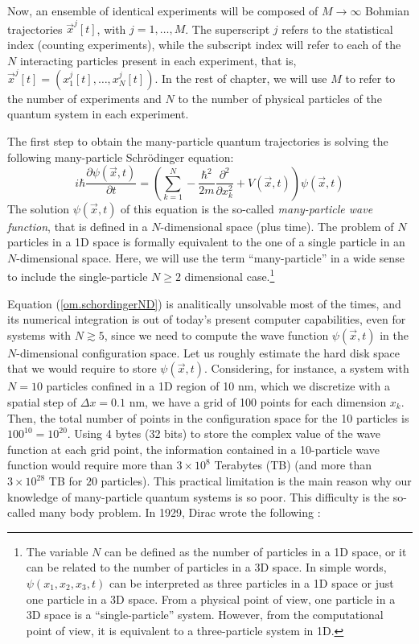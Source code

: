 \documentclass[nofootinbib, secnumarabic, amsmath, nobibnotes,11pt,aps,pra, floatfix]{revtex4-1}
\newcommand{\Eref}[1]{Equation (\ref{#1})}
\begin{document}
Now, an ensemble of identical experiments  will be composed of $M\rightarrow\infty$
Bohmian trajectories $\vec{x}^j[t]$, with $j = 1,\ldots,M$. The superscript
$j$ refers to the statistical index (counting experiments), while
the subscript index will refer to each of the $N$ interacting particles present in each experiment,
that is, $\vec{x}^j[t] = (x^j_{1}[t],\ldots,x^j_{N}[t] )$. In the rest of chapter, we will use $M$ to refer to the number of experiments and $N$ to the number of physical particles of the quantum system in each experiment. 

The first step to obtain the many-particle quantum trajectories is solving the following many-particle Schr\"{o}dinger equation:
\begin{equation}
\label{om.schordingerND}
i \hbar \frac{\partial \psi(\vec{x},t)}{\partial t} = \left(\sum_{k = 1}^N -\frac{\hbar^2}{2m}\frac {\partial^2} {\partial x_k^2} + V(\vec{x},t) \right) \psi(\vec{x},t)
\end{equation}
The solution $\psi(\vec{x},t)$ of this equation is the so-called
\textit{many-particle wave function}, that is defined in a
$N$-dimensional space (plus time). The problem of $N$ particles in a
1D space is formally equivalent to the one of a single particle in
an $N$-dimensional space. Here, we will use the term ``many-particle''
in a wide sense to include the single-particle $N\geq2$
dimensional case.\footnote{The variable $N$ can be defined as the
number of particles in a 1D space, or it can be related to the
number of particles in a 3D space. In
simple words, $\psi(x_1,x_2,x_3,t)$ can be interpreted as three
particles in a 1D space or just one particle in a 3D space. From a
physical point of view, one particle in a 3D space is a
``single-particle'' system. However, from the computational point of
view, it is equivalent to a three-particle system in 1D.}

\Eref{om.schordingerND} is analitically unsolvable most of the times, and its numerical integration is out of today's present computer capabilities, even for systems with $N \gtrsim 5$, since we need to compute the wave function $\psi(\vec{x},t)$ in the $N$-dimensional configuration space.
Let us roughly estimate the hard disk space that we would require to store $\psi(\vec{x},t)$.
Considering, for instance, a system with $N = 10$ particles confined in a 1D region of 10 nm, which we discretize with a spatial step of $\Delta x = 0.1$ nm, we have a grid of 100 points for each dimension $x_k$.
Then, the total number of points in the configuration space for the 10 particles is $100^{10} = 10^{20}$.
Using 4 bytes (32 bits) to store the complex value of the wave function at each grid point, the information contained in a 10-particle wave function would require more than $3 \times 10^8$ Terabytes (TB) (and more than $3\times 10^{28}$ TB for $20$ particles).
This practical limitation is the main reason why our knowledge of many-particle quantum systems is so poor. This difficulty is the so-called many body problem. 
In 1929, Dirac wrote the following \cite{om.dirac1929bis}:\\\vspace*{-6pt}
\end{document}
